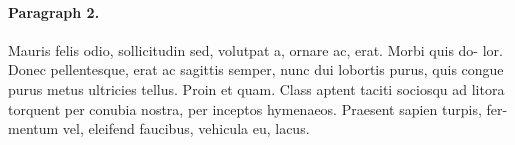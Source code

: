 \documentclass{utue} %
\begin{document}
\paragraph{Paragraph 2.} Mauris felis odio, sollicitudin
sed, volutpat a, ornare ac, erat. Morbi quis do-
lor. Donec pellentesque, erat ac sagittis semper,
nunc dui lobortis purus, quis congue purus metus
ultricies tellus. Proin et quam. Class aptent taciti
sociosqu ad litora torquent per conubia nostra, per
inceptos hymenaeos. Praesent sapien turpis, fer-
mentum vel, eleifend faucibus, vehicula eu, lacus.



\end{document}
